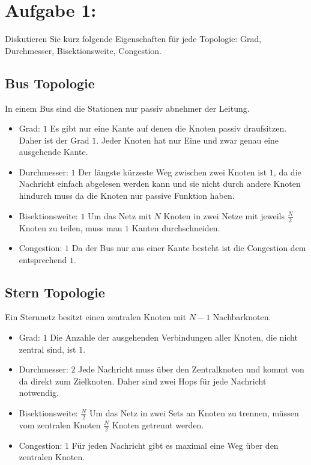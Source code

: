 \section{Aufgabe 1:}
Diskutieren Sie kurz folgende Eigenschaften für jede Topologie: Grad,
Durchmesser, Bisektionsweite, Congestion.
\subsection{Bus Topologie}
In einem Bus sind die Stationen nur passiv abnehmer der Leitung.
\begin{itemize}
  \item Grad: $1$
  \newline Es gibt nur eine Kante auf denen die Knoten passiv draufsitzen. Daher
  ist der Grad $1$. Jeder Knoten hat nur Eine und zwar genau eine ausgehende
  Kante.
  \item Durchmesser: $1$
   \newline Der längste kürzeste Weg zwischen zwei Knoten ist $1$, da die
   Nachricht einfach abgelesen werden kann und sie nicht durch andere Knoten
   hindurch muss da die Knoten nur passive Funktion haben.
  \item Bisektionsweite: $1$
  \newline  Um das Netz mit $N$ Knoten in zwei Netze mit jeweils $\frac{N}{2}$
  Knoten zu teilen, muss man $1$ Kanten durchschneiden.
  \item Congestion: $1$
  \newline Da der Bus nur aus einer Kante besteht ist die Congestion dem
  entsprechend $1$.
\end{itemize}

\subsection{Stern Topologie}
Ein Sternnetz besitzt einen zentralen Knoten mit $N-1$ Nachbarknoten.

\begin{itemize}
  \item Grad: $1$ \newline Die Anzahle der ausgehenden Verbindungen aller
  Knoten, die nicht zentral sind, ist $1$.
  \item Durchmesser: $2$ \newline Jede Nachricht muss über den Zentralknoten und
  kommt von da direkt zum Zielknoten. Daher sind zwei Hops für jede Nachricht
  notwendig.
  \item Bisektionsweite: $\frac{N}{2}$ \newline Um das Netz in zwei Sets an
  Knoten zu trennen, müssen vom zentralen Knoten $\frac{N}{2}$ Knoten getrennt
  werden.
  \item Congestion: $1$ \newline Für jeden Nachricht gibt es maximal eine Weg
  über den zentralen Knoten.
\end{itemize}

